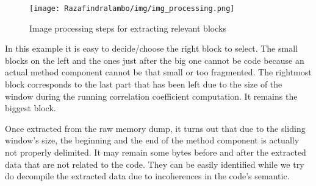 \begin{figure}[!h]
\begin{center}
    \texttt{[image: Razafindralambo/img/img\_processing.png]}
    \caption{Image processing steps for extracting relevant blocks}
    \label{fig:extract1}
\end{center}
\end{figure}
In this example it is easy to decide/choose the right block to select. The small blocks on the left
and the ones  just after the big one cannot be code because an actual method component cannot be
that small or too fragmented. The rightmost block corresponds to the last part that has been left
due to the size of the window during the running correlation coefficient computation.  It remains
the biggest block. 

Once extracted from the raw memory dump, it turns out that due to the sliding window's size, the
beginning and the end of the method component is actually not properly delimited. It may remain some
bytes before and after the extracted data that are not related to the code. They can be easily
identified while we try do decompile the extracted data due to incoherences in the code's semantic.




